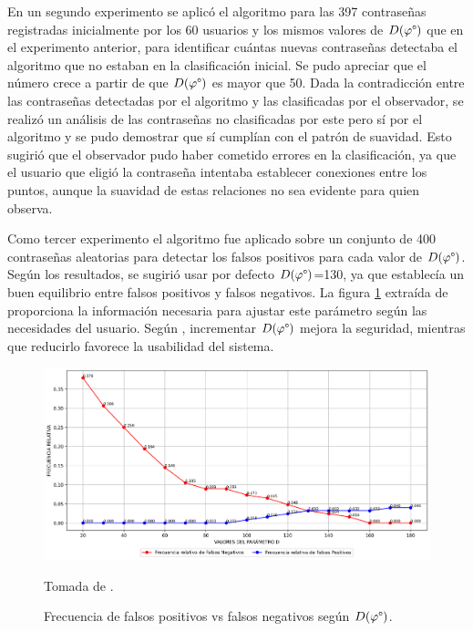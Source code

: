 \documentclass[12pt]{report}
\begin{document}
En un segundo experimento se aplicó el algoritmo para las 397 contraseñas registradas inicialmente por los 60 usuarios y los mismos valores de $D(\varphi\degree)$ que en el experimento anterior, para identificar cuántas nuevas contraseñas detectaba el algoritmo que no estaban en la clasificación inicial. Se pudo apreciar que el número crece a partir de que $D(\varphi\degree)$ es mayor que 50\degree. Dada la contradicción entre las contraseñas detectadas por el algoritmo y las clasificadas por el observador, se realizó un análisis de las contraseñas no clasificadas por este pero sí por el algoritmo y se pudo demostrar que sí cumplían con el patrón de suavidad. Esto sugirió que el observador pudo haber cometido errores en la clasificación, ya que el usuario que eligió la contraseña intentaba establecer conexiones entre los puntos, aunque la suavidad de estas relaciones no sea evidente para quien observa.
 

Como tercer experimento el algoritmo fue aplicado sobre un conjunto de 400 contraseñas aleatorias para detectar los falsos positivos para cada valor de $D(\varphi\degree)$. Según los resultados, se sugirió usar por defecto $D(\varphi\degree)$=130\degree, ya que establecía un buen equilibrio entre falsos positivos y falsos negativos. La figura \ref{frecuencia}  extraída de \cite{3} proporciona la información necesaria para ajustar este parámetro según las necesidades del usuario. Según \cite{3}, incrementar $D(\varphi\degree)$ mejora la seguridad, mientras que reducirlo favorece la usabilidad del sistema.

\begin{figure}[ht]
	\centering
	\includegraphics[width=1\textwidth]{grafosviel.png}
	\caption{Frecuencia de falsos positivos vs falsos negativos según ${D(\varphi\degree)}$.} Tomada de \cite{3}.
	\label{frecuencia}
\end{figure}
\end{document}
